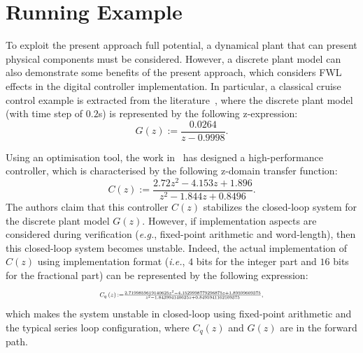 \documentclass{sig-alternate-05-2015}
\begin{document}
\section{Running Example} \label{sec:running-ex}

To exploit the present approach full potential, a dynamical plant that can
present physical components must be considered.  However, a discrete plant
model can also demonstrate some benefits of the present approach, which
considers FWL effects in the digital controller implementation.  In
particular, a classical cruise control example is extracted from the
literature~\cite{Astrom08}, where the discrete plant model (with time step
of $0.2$s) is represented by the following z-expression:
%
\begin{equation}
\label{Eq:running-example-plant}
G\left(z\right) := \frac{0.0264}{z-0.9998}.
\end{equation}

Using an optimisation tool, the work in~\cite{DBLP:conf/hybrid/WangGRJF16}
has designed a high-performance controller, which is characterised by the
following z-domain transfer function:
%
\begin{equation}
\label{Eq:running-example-controller}
C\left(z\right) := \frac{2.72z^2 - 4.153z + 1.896}{z^2 - 1.844z + 0.8496}.
\end{equation}
%
The authors claim that this controller $C(z)$ stabilizes the closed-loop
system for the discrete plant model $G(z)$.  However, if implementation
aspects are considered during verification ({\it e.g.}, fixed-point
arithmetic and word-length), then this closed-loop system becomes unstable.
%
Indeed, the actual implementation of $C(z)$ using 
implementation format ({\it i.e.}, $4$ bits for the integer part and $16$
bits for the fractional part) can be represented by the following
expression:
%
\begin{equation}
\label{Eq:running-example-controller-quantized}
\resizebox{0.5\textwidth}{!}{
$C_{q}\left(z\right) {:=} \frac{2.7199859619140625z^2{-}4.1529998779296875z
{+}1.89599609375}{z^2{-}1.843994140625z+0.8495941162109375},$
}
\end{equation} 
%
which makes the system unstable in closed-loop using fixed-point arithmetic
and the typical series loop configuration, where $C_{q}\left(z\right)$ and
$G\left(z\right)$ are in the forward path.

\end{document}
